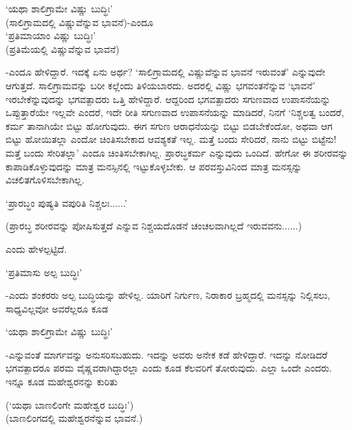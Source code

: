 \begin{shloka}
`ಯಥಾ ಶಾಲಿಗ್ರಾಮೇ ವಿಷ್ಣು ಬುದ್ಧಿಃ'\\
(ಸಾಲಿಗ್ರಾಮದಲ್ಲಿ ವಿಷ್ಣುವೆನ್ನುವ ಭಾವನೆ)-ಎಂದೂ\\
`ಪ್ರತಿಮಾಯಾಂ ವಿಷ್ಣು ಬುದ್ಧಿಃ'\\
(ಪ್ರತಿಮೆಯಲ್ಲಿ ವಿಷ್ಣುವೆನ್ನುವ ಭಾವನೆ)
\end{shloka}

-ಎಂದೂ ಹೇಳಿದ್ದಾರೆ. ಇದಕ್ಕೆ ಏನು ಅರ್ಥ? `ಸಾಲಿಗ್ರಾಮದಲ್ಲಿ ವಿಷ್ಣುವೆನ್ನುವ ಭಾವನೆ ಇರುವಂತೆ' ಎನ್ನುವುದೇ ಆಗುತ್ತದೆ. ಸಾಲಿಗ್ರಾಮವನ್ನು ಬರೀ ಕಲ್ಲೆಂದು ತಿಳಿಯಬಾರದು. ಅದರಲ್ಲಿ ವಿಷ್ಣು ಭಗವಂತನೆನ್ನುವ `ಭಾವನೆ' ಇರಬೇಕೆನ್ನುವುದನ್ನು ಭಗವತ್ಪಾದರು ಒತ್ತಿ ಹೇಳಿದ್ದಾರೆ. ಆದ್ದರಿಂದ ಭಗವತ್ಪಾದರು ಸಗುಣವಾದ ಉಪಾಸನೆಯನ್ನು ಒಪ್ಪುತ್ತಾರೆಯೇ ಇಲ್ಲವೇ ಎಂದರೆ, ಇದೇ ರೀತಿ ಸಗುಣವಾದ ಉಪಾಸನೆಯನ್ನು ಮಾಡಿದರೆ, ನಿನಗೆ `ನಿಶ್ಚಲತ್ವ ಬಂದರೆ, ಕರ್ಮ ತಾನಾಗಿಯೇ ಬಿಟ್ಟು ಹೋಗುವುದು. ಈಗ ಸಗುಣ ಆರಾಧನೆಯನ್ನು ಬಿಟ್ಟು ಬಿಡಬೇಕೆಂದೋ, ಅಥವಾ ಆಗ ಬಿಟ್ಟು ಹೋಯಿತಲ್ಲಾ ಎಂದೋ ಚಿಂತಿಸಬೇಕಾದ ಆವಶ್ಯಕತೆ ಇಲ್ಲ. ಮತ್ತೆ ಬಂದು ಸೇರಿದರೆ, ನಾನು ಬಿಟ್ಟು ಬಿಟ್ಟೆನು! ಮತ್ತೆ ಬಂದು ಸೇರಿತಲ್ಲಾ' ಎಂದೂ ಚಿಂತಿಸಬೇಕಾಗಿಲ್ಲ. ಪ್ರಾರಬ್ಧಕರ್ಮ ಎನ್ನುವುದು ಒಂದಿದೆ. ಹೇಗೋ ಈ ಶರೀರವನ್ನು ಕಾಪಾಡಿಕೊಳ್ಳುವುದನ್ನು ಮಾತ್ರ ಮನಸ್ಸಿನಲ್ಲಿ ಇಟ್ಟುಕೊಳ್ಳಬೇಕು. ಆ ಪರವಸ್ತುವಿನಿಂದ ಮಾತ್ರ ಮನಸ್ಸನ್ನು ವಿಚಲಿತಗೊಳಿಸಬೇಕಾಗಿಲ್ಲ.

\begin{shloka}
`ಪ್ರಾರಬ್ಧಂ ಪುಷ್ಯತಿ ವಪುರಿತಿ ನಿಶ್ಚಲಃ......'
\end{shloka}

(ಪ್ರಾರಬ್ಧ ಶರೀರವನ್ನು ಪೋಷಿಸುತ್ತದೆ ಎನ್ನುವ ನಿಶ್ಚಯದೊಡನೆ ಚಂಚಲವಾಗಿಲ್ಲದೆ ಇರುವವನು......)

ಎಂದು ಹೇಳಲ್ಪಟ್ಟಿದೆ.

\begin{shloka}
`ಪ್ರತಿಮಾಸು ಅಲ್ಪ ಬುದ್ಧಿಃ'
\end{shloka}

-ಎಂದು ಶಂಕರರು ಅಲ್ಪ ಬುದ್ಧಿಯನ್ನು ಹೇಳಿಲ್ಲ. ಯಾರಿಗೆ ನಿರ್ಗುಣ, ನಿರಾಕಾರ ಬ್ರಹ್ಮದಲ್ಲಿ ಮನಸ್ಸನ್ನು ನಿಲ್ಲಿಸಲು, ಸಾಧ್ಯವಿಲ್ಲವೋ ಅವರೆಲ್ಲರೂ ಕೂಡ

\begin{shloka}
`ಯಥಾ ಶಾಲಿಗ್ರಾಮೇ ವಿಷ್ಣು ಬುದ್ಧಿಃ'
\end{shloka}

-ಎನ್ನುವಂತೆ ಮಾರ್ಗವನ್ನು ಅನುಸರಿಸಬಹುದು. ಇದನ್ನು ಅವರು ಅನೇಕ ಕಡೆ ಹೇಳಿದ್ದಾರೆ. ಇದನ್ನು ನೋಡಿದರೆ ಭಗವತ್ಪಾದರೂ ಪರಮ ವೈಷ್ಣವರಾಗಿದ್ದಾರಲ್ಲಾ ಎಂದು ಕೂಡ ಕೆಲವರಿಗೆ ತೋರುವುದು. ಎಲ್ಲಾ ಒಂದೇ ಎಂದರು. ಇನ್ನೂ ಕೂಡ ಮಹೇಶ್ವರನನ್ನು ಕುರಿತು


\begin{shloka}
(`ಯಥಾ ಬಾಣಲಿಂಗೇ ಮಹೇಶ್ವರ ಬುದ್ಧಿಃ')\\
(ಬಾಣಲಿಂಗದಲ್ಲಿ ಮಹೇಶ್ವರನೆನ್ನುವ ಭಾವನೆ.)
\end{shloka}

